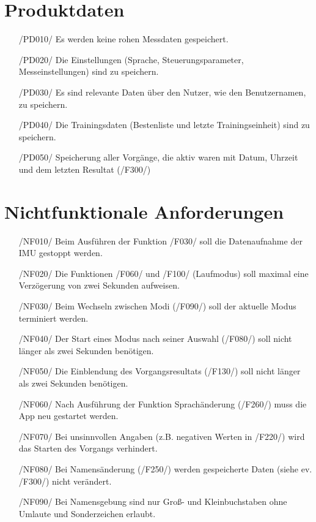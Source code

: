 \documentclass[a4paper,12pt]{article}
\begin{document}
\section{Produktdaten}
\begin{itemize}
	\item[/PD010/] Es werden keine rohen Messdaten gespeichert.
	\item[/PD020/] Die Einstellungen (Sprache, Steuerungsparameter, Messeinstellungen) sind zu speichern. 
	\item[/PD030/] Es sind relevante Daten über den Nutzer, wie den Benutzernamen, zu speichern.
	\item[/PD040/] Die Trainingsdaten (Bestenliste und letzte Trainingseinheit) sind zu speichern. %
	\item[/PD050/] Speicherung aller Vorgänge, die aktiv waren mit Datum, Uhrzeit und dem letzten Resultat (/F300/)%
\end{itemize}


\section{Nichtfunktionale Anforderungen}

\begin{itemize}
  \item[/NF010/] Beim Ausführen der Funktion /F030/ soll die Datenaufnahme der IMU gestoppt werden.
  \item[/NF020/] Die Funktionen /F060/ und /F100/ (Laufmodus) soll maximal eine Verzögerung von zwei Sekunden aufweisen. %
  \item[/NF030/] Beim Wechseln zwischen Modi (/F090/) soll der aktuelle Modus terminiert werden.
  \item[/NF040/] Der Start eines Modus nach seiner Auswahl (/F080/) soll nicht länger als zwei Sekunden benötigen. %
  \item[/NF050/] Die Einblendung des Vorgangsresultats (/F130/) soll nicht länger als zwei Sekunden benötigen.%
  \item[/NF060/] Nach Ausführung der Funktion  Sprachänderung (/F260/) muss die App neu gestartet werden.
  \item[/NF070/] Bei unsinnvollen Angaben (z.B. negativen Werten in /F220/) wird das Starten des Vorgangs verhindert.
  \item[/NF080/] Bei Namensänderung (/F250/) werden gespeicherte Daten (siehe ev. /F300/) nicht verändert.
  \item[/NF090/] Bei Namensgebung sind nur Groß- und Kleinbuchstaben ohne Umlaute und Sonderzeichen erlaubt.
\end{itemize}
\end{document}
